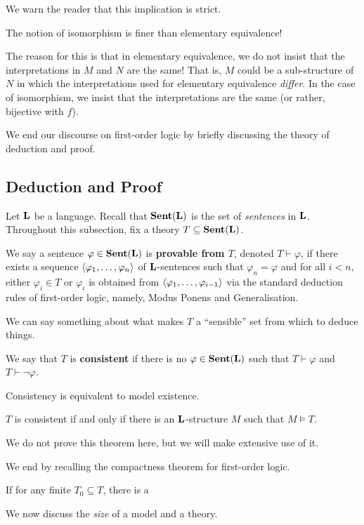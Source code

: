 We warn the reader that this implication is strict.

\begin{boxwarning}
    The notion of isomorphism is finer than elementary equivalence!
\end{boxwarning} %

The reason for this is that in elementary equivalence, we do not insist that the interpretations in $M$ and $N$ are the same! That is, $M$ could be a sub-structure of $N$ in which the interpretations used for elementary equivalence \textit{differ}. In the case of isomorphism, we insist that the interpretations are the same (or rather, bijective with $f$).


We end our discourse on first-order logic by briefly discussing the theory of deduction and proof.

\subsection{Deduction and Proof}

Let $\mathbf{L}$ be a language. Recall that $\mathbf{Sent}\!\left( \mathbf{L} \right)$ is the set of \textit{sentences} in $\mathbf{L}$. Throughout this subsection, fix a theory $T \subseteq \mathbf{Sent}\!\left( \mathbf{L} \right)$.

\begin{boxdefinition}[Provability]
    We say a sentence $\varphi \in \mathbf{Sent}\!\left( \mathbf{L} \right)$ is \textbf{provable from $T$}, denoted $T \vdash \varphi$, if there exists a sequence $\left\langle \varphi_1, \ldots, \varphi_n \right\rangle$ of $\mathbf{L}$-sentences such that $\varphi_n = \varphi$ and for all $i < n$, either $\varphi_i \in T$ or $\varphi_{i}$ is obtained from $\left\langle \varphi_1, \ldots, \varphi_{i - 1} \right\rangle$ via the standard deduction rules of first-order logic, namely, Modus Ponens and Generalisation.
\end{boxdefinition}

We can say something about what makes $T$ a ``sensible'' set from which to deduce things.

\begin{boxdefinition}[Consistency]
    We say that $T$ is \textbf{consistent} if there is no $\varphi \in \mathbf{Sent}\!\left( \mathbf{L} \right)$ such that $T \vdash \varphi$ and $T \vdash \neg\varphi$.
\end{boxdefinition}

Consistency is equivalent to model existence.

\begin{boxtheorem}
    $T$ is consistent if and only if there is an $\mathbf{L}$-structure $M$ such that $M \models T$.
\end{boxtheorem}

We do not prove this theorem here, but we will make extensive use of it.

We end by recalling the compactness theorem for first-order logic.

\begin{boxtheorem}
    If for any finite $T_0 \subseteq T$, there is a 
\end{boxtheorem}

We now discuss the \textit{size} of a model and a theory.